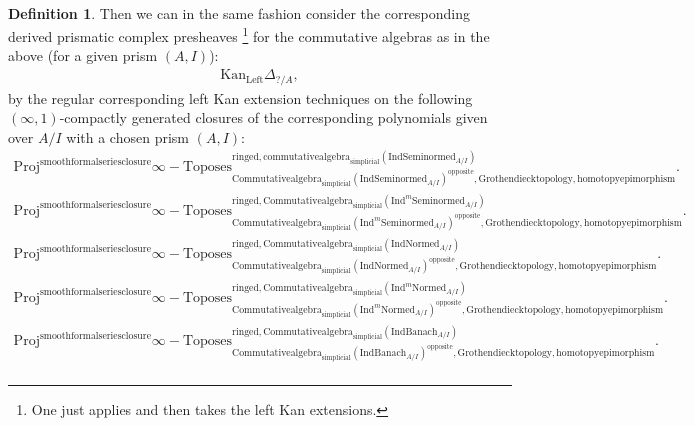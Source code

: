 \documentclass[11pt]{book}
\theoremstyle{definition}
\newtheorem{definition}[theorem]{Definition}
\numberwithin{equation}{section}
\begin{document}
\

\begin{definition}
Then we can in the same fashion consider the corresponding derived prismatic complex presheaves \cite[Construction 7.6]{12BS}\footnote{One just applies \cite[Construction 7.6]{12BS} and then takes the left Kan extensions.} for the commutative algebras as in the above (for a given prism $(A,I)$):
\begin{align}
\mathrm{Kan}_{\mathrm{Left}}\Delta_{?/A},	
\end{align}
by the regular corresponding left Kan extension techniques on the following $(\infty,1)$-compactly generated closures of the corresponding polynomials given over $A/I$ with a chosen prism $(A,I)$:\\

\begin{align}
\mathrm{Proj}^\text{smoothformalseriesclosure}\infty-\mathrm{Toposes}^{\mathrm{ringed},\mathrm{commutativealgebra}_{\mathrm{simplicial}}(\mathrm{Ind}\mathrm{Seminormed}_{A/I})}_{\mathrm{Commutativealgebra}_{\mathrm{simplicial}}(\mathrm{Ind}\mathrm{Seminormed}_{A/I})^\mathrm{opposite},\mathrm{Grothendiecktopology,homotopyepimorphism}}. \\
\mathrm{Proj}^\text{smoothformalseriesclosure}\infty-\mathrm{Toposes}^{\mathrm{ringed},\mathrm{Commutativealgebra}_{\mathrm{simplicial}}(\mathrm{Ind}^m\mathrm{Seminormed}_{A/I})}_{\mathrm{Commutativealgebra}_{\mathrm{simplicial}}(\mathrm{Ind}^m\mathrm{Seminormed}_{A/I})^\mathrm{opposite},\mathrm{Grothendiecktopology,homotopyepimorphism}}.\\
\mathrm{Proj}^\text{smoothformalseriesclosure}\infty-\mathrm{Toposes}^{\mathrm{ringed},\mathrm{Commutativealgebra}_{\mathrm{simplicial}}(\mathrm{Ind}\mathrm{Normed}_{A/I})}_{\mathrm{Commutativealgebra}_{\mathrm{simplicial}}(\mathrm{Ind}\mathrm{Normed}_{A/I})^\mathrm{opposite},\mathrm{Grothendiecktopology,homotopyepimorphism}}.\\
\mathrm{Proj}^\text{smoothformalseriesclosure}\infty-\mathrm{Toposes}^{\mathrm{ringed},\mathrm{Commutativealgebra}_{\mathrm{simplicial}}(\mathrm{Ind}^m\mathrm{Normed}_{A/I})}_{\mathrm{Commutativealgebra}_{\mathrm{simplicial}}(\mathrm{Ind}^m\mathrm{Normed}_{A/I})^\mathrm{opposite},\mathrm{Grothendiecktopology,homotopyepimorphism}}.\\
\mathrm{Proj}^\text{smoothformalseriesclosure}\infty-\mathrm{Toposes}^{\mathrm{ringed},\mathrm{Commutativealgebra}_{\mathrm{simplicial}}(\mathrm{Ind}\mathrm{Banach}_{A/I})}_{\mathrm{Commutativealgebra}_{\mathrm{simplicial}}(\mathrm{Ind}\mathrm{Banach}_{A/I})^\mathrm{opposite},\mathrm{Grothendiecktopology,homotopyepimorphism}}.\\

\end{align}
\end{definition}
\end{document}
